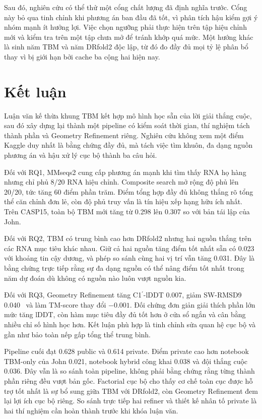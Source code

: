 \documentclass[12pt,a4paper,oneside]{report}
\newcommand{\cprime}{C1$^{\prime}$}
\newcommand{\angstrom}{\text{\AA}}
\begin{document}
Sau đó, nghiên cứu có thể thử một cổng chất lượng đã định nghĩa trước. Cổng này bỏ qua
tinh chỉnh khi phương án ban đầu đã tốt, vì phân tích hậu kiểm gợi ý nhóm mạnh ít hưởng
lợi. Việc chọn ngưỡng phải thực hiện trên tập hiệu chỉnh mới và kiểm tra trên một tập chưa
mở để tránh khớp quá mức. Một hướng khác là sinh năm TBM và năm DRfold2 độc lập, từ đó
đo đầy đủ mọi tỷ lệ phân bổ thay vì bị giới hạn bởi cache ba cộng hai hiện nay.

\chapter{Kết luận}
\label{chap:conclusion_vi}

Luận văn kế thừa khung TBM kết hợp mô hình học sẵn của lời giải thắng cuộc, sau đó xây dựng
lại thành một pipeline có kiểm soát thời gian, thí nghiệm tách thành phần và Geometry
Refinement riêng. Nghiên cứu không xem một điểm Kaggle duy nhất là bằng chứng đầy đủ, mà
tách việc tìm khuôn, đa dạng nguồn phương án và hậu xử lý cục bộ thành ba câu hỏi.

Đối với RQ1, MMseqs2 cung cấp phương án mạnh khi tìm thấy RNA họ hàng nhưng chỉ phủ 8/20
RNA hiệu chỉnh. Composite search mở rộng độ phủ lên 20/20, tức tăng 60 điểm phần trăm.
Điểm tổng hợp đầy đủ không thắng rõ tổng thể căn chỉnh đơn lẻ, còn độ phủ truy vấn là tín
hiệu xếp hạng hữu ích nhất. Trên CASP15, toàn bộ TBM mới tăng từ 0.298 lên 0.307 so với
bản tái lập của John.

Đối với RQ2, TBM có trung bình cao hơn DRfold2 nhưng hai nguồn thắng trên các RNA mục tiêu khác nhau.
Giữ cả hai nguồn tăng điểm tốt nhất sẵn có 0.023 với khoảng tin cậy dương, và phép so
sánh cùng hai vị trí vẫn tăng 0.031. Đây là bằng chứng trực tiếp rằng sự đa dạng nguồn có
thể nâng điểm tốt nhất trong năm dự đoán dù không có nguồn nào luôn vượt nguồn kia.

Đối với RQ3, Geometry Refinement tăng \cprime{}-lDDT 0.007, giảm SW-RMSD9
0.040~\angstrom{} và làm TM-score thay đổi $-0.001$. Đối chứng đơn giản giải thích phần
lớn mức tăng lDDT, còn hàm mục tiêu đầy đủ tốt hơn ở cửa sổ ngắn và cân bằng nhiều chỉ số
hình học hơn. Kết luận phù hợp là tinh chỉnh sửa quan hệ cục bộ và gần như bảo toàn nếp
gấp tổng thể trung bình.

Pipeline cuối đạt 0.628 public và 0.614 private. Điểm private cao hơn notebook TBM-only
của John 0.021, notebook hybrid công khai 0.038 và đội thắng cuộc 0.036. Đây vẫn là so
sánh toàn pipeline, không phải bằng chứng rằng từng thành phần riêng đều vượt bản gốc.
Factorial cục bộ cho thấy cơ chế toàn cục được hỗ trợ tốt nhất là sự bổ sung giữa TBM với
DRfold2, còn Geometry Refinement đem lại lợi ích cục bộ riêng. So sánh trực tiếp hai
refiner và thiết kế nhân tố private là hai thí nghiệm cần hoàn thành trước khi khóa luận văn.
\end{document}
